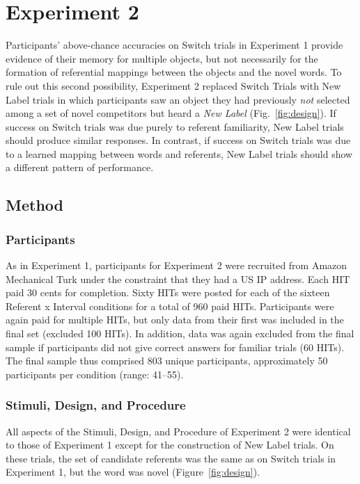 \documentclass[authoryear,review]{elsarticle}
\begin{document}
\section{Experiment 2}

Participants' above-chance accuracies on Switch trials in Experiment 1 provide evidence of their memory for multiple objects, but not necessarily for the formation of referential mappings between the objects and the novel words. To rule out this second possibility, Experiment 2 replaced Switch Trials with New Label trials in which participants saw an object they had previously \emph{not} selected among a set of novel competitors but heard a \emph{New Label} (Fig.~\ref{fig:design}). If success on Switch trials was due purely to referent familiarity, New Label trials should produce similar responses. In contrast, if success on Switch trials was due to a learned mapping between words and referents, New Label trials should show a different pattern of performance.

\subsection{Method}

\subsubsection{Participants}

As in Experiment 1, participants for Experiment 2 were recruited from Amazon Mechanical Turk under the constraint that they had a US IP address. Each HIT paid 30 cents for completion. Sixty HITs were posted for each of the sixteen Referent x Interval conditions for a total of 960 paid HITs. Participants were again paid for multiple HITs, but only data from their first was included in the final set (excluded 100 HITs). In addition, data was again excluded from the final sample if participants did not give correct answers for familiar trials (60 HITs). The final sample thus comprised 803 unique participants, approximately 50 participants per condition (range: 41--55).

\subsubsection{Stimuli, Design, and Procedure}

All aspects of the Stimuli, Design, and Procedure of Experiment 2 were identical to those of Experiment 1 except for the construction of New Label trials. On these trials, the set of candidate referents was the same as on Switch trials in Experiment 1, but the word was novel (Figure~\ref{fig:design}).
\end{document}
